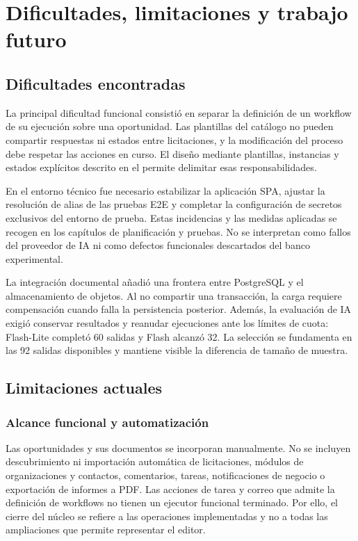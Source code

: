 \chapter{Dificultades, limitaciones y trabajo futuro}
\label{chap:future-work}

\section{Dificultades encontradas}

La principal dificultad funcional consistió en separar la definición de un
workflow de su ejecución sobre una oportunidad. Las plantillas del catálogo no
pueden compartir respuestas ni estados entre licitaciones, y la modificación
del proceso debe respetar las acciones en curso. El diseño mediante plantillas,
instancias y estados explícitos descrito en el 
permite delimitar esas responsabilidades.

En el entorno técnico fue necesario estabilizar la aplicación SPA, ajustar la
resolución de alias de las pruebas E2E y completar la configuración de secretos
exclusivos del entorno de prueba. Estas incidencias y las medidas aplicadas se
recogen en los capítulos de planificación y pruebas. No se interpretan como
fallos del proveedor de IA ni como defectos funcionales descartados del banco
experimental.

La integración documental añadió una frontera entre PostgreSQL y el
almacenamiento de objetos. Al no compartir una transacción, la carga requiere
compensación cuando falla la persistencia posterior. Además, la evaluación de
IA exigió conservar resultados y reanudar ejecuciones ante los límites de
cuota: Flash-Lite completó 60 salidas y Flash alcanzó 32. La selección se
fundamenta en las 92 salidas disponibles y mantiene visible la diferencia de
tamaño de muestra.

\section{Limitaciones actuales}

\subsection{Alcance funcional y automatización}

Las oportunidades y sus documentos se incorporan manualmente. No se incluyen
descubrimiento ni importación automática de licitaciones, módulos de
organizaciones y contactos, comentarios, tareas, notificaciones de negocio o
exportación de informes a PDF. Las acciones de tarea y correo que admite la
definición de workflows no tienen un ejecutor funcional terminado. Por ello,
el cierre del núcleo se refiere a las operaciones implementadas y no a todas
las ampliaciones que permite representar el editor.

